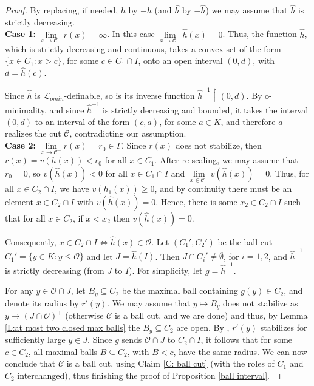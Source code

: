 \documentclass[11pt]{amsart}
\theoremstyle{definition}
\newcommand{\CL}{{\mathcal L}}
\newcommand{\CC}{{\mathcal C}}
\newcommand{\CO}{{\mathcal O}}
\newcommand{\0}{\emptyset}
\def\sub{\subseteq}
\begin{document}
\begin{proof}
By replacing, if needed,  $h$ by $-h$ (and $\widehat h$ by $-\widehat h$) we may assume that $\widehat h$ is strictly decreasing.\\

 \noindent\textbf{Case 1: } $\lim\limits_{x\to \CC^-} r(x)=\infty$. In this case $\lim\limits_{x\to \CC^-}\widehat h(x)=0$. Thus, the function $\widehat h$, which is strictly decreasing and continuous, takes a convex set of the form 
 $\{x\in C_1:x>c\}$, for some $c\in C_1\cap I$, onto an open interval $(0,d)$, with $d=\widehat h(c)$.  
 
 
 Since $\widehat h$ is  $\CL_{omin}$-definable, so is its inverse function $\widehat h^{-1}\restriction(0,d)$. By o-minimality, and since $\hat h^{-1}$ is strictly decreasing and bounded, it takes the interval $(0,d)$ to an interval of the form $(c,a)$, for some $a\in K$,  and therefore $a$ realizes the cut $\mathcal C$, contradicting our assumption. \\
 
 
 \noindent\textbf{Case 2: } $\lim\limits_{x\to \CC^-} r(x)=r_0\in \Gamma$. 
Since $r(x)$ does not stabilize, then $r(x)=v(h(x))<r_0$ for all $x\in C_1$. After re-scaling, we may assume that $r_0=0$, so $v(\widehat h(x))<0$ for all $x\in C_1\cap I$ and   $\lim\limits_{x\in \CC^-}v(\widehat h(x))=0$. Thus,  for all $x\in C_2\cap I$, we  have $v(h_1(x))\geq 0$, and by continuity there must be an element $x\in C_2\cap I$ with $v(\widehat h(x))=0$. Hence, there is some $x_2\in C_2\cap I$ such that for all $x\in C_2$, if $x<x_2$ then $v(\widehat h(x))=0$. 

Consequently, $x\in C_2\cap I\iff \widehat h(x)\in \CO$. Let $(C_1',C_2')$ be the ball cut  $C_1'=\{y\in K:y\leq \CO\}$ and let $J=\widehat h(I)$. Then $J\cap C_i'\neq \emptyset$, for $i=1,2$, and  $\widehat h^{-1}$ is strictly decreasing (from $J$ to $I$). %
For simplicity, let $g=\widehat h^{-1}$.

For any $y\in \CO\cap J$, let $B_y\subseteq C_2$ be the maximal ball containing $g(y)\in C_2$, and denote its radius by $r'(y)$. We may assume that $y\mapsto B_y$ does not stabilize as $y\to (J\cap \CO)^+$ (otherwise $\CC$ is a ball cut, and we are done) and thus, by Lemma \ref{L:at most two closed max balls}  the $B_y\sub C_2$ are open. By \cite[Proposition 4.2]{vdDries-Tconvex}, $r'(y)$ stabilizes for sufficiently large $y\in  J$. Since $g$
sends $\CO\cap J$ to $C_2\cap I$, it follows that for some $c\in C_2$, all maximal balls $B\sub C_2$, with $B<c$, have the same radius. We can now conclude that $\mathcal C$ is a ball cut, using Claim \ref{C: ball cut} (with the roles of $C_1$ and $C_2$ interchanged), thus finishing the proof of Proposition \ref{ball interval}.
\end{proof}
\end{document}
